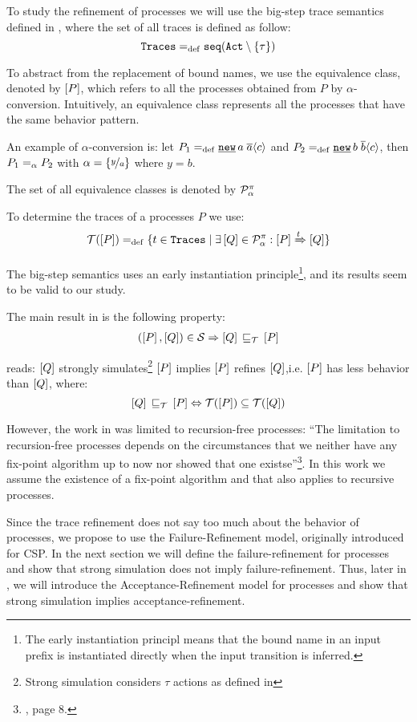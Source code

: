 To study the refinement of \picalc{} processes we will use the big-step trace semantics defined in \cite{gieseking}, where the set of all traces is defined as follow:
\[\tr \define \seqset{\actions\setminus\set{\tau}}\]

To abstract from the replacement of bound names, we use the equivalence class, denoted by $\left[P\right]$, which refers to all the processes obtained from $P$ by $\alpha$-conversion. Intuitively, an equivalence class represents all the processes that have the same behavior pattern.

An example of $\alpha$-conversion is: let $P_1\define\procres{a}{\out{a}{c}}$ and $P_2\define\procres{b}{\out{b}{c}}$, then $P_1 =_\alpha{} P_2$ with $\alpha = \left\{\nicefrac{y}{a}\right\}$ where $y = b$.

The set of all equivalence classes is denoted by $\mathcal P^{\pi}_\alpha$ 

To determine the traces of a processes $P$ we use:
\begin{align}
    \traces[P] \define \{t\in \tr \mid \exists \ec{Q}\in\procsApha: \ec{P} \bigstep{t} \ec{Q}\}
\label{determine_trace}
\end{align}

The big-step semantics uses an early instantiation principle\footnote{The early instantiation principl means that the bound name in an input prefix is instantiated directly when the input transition is inferred.}, and its results seem to be valid to our study.

The main result in \cite{gieseking} is the following property:
\begin{align}
    (\ec{P},\ec{Q})\in{}\simu \Rightarrow \ec{Q} \refi \ec{P} \label{property1}
\end{align}

 reads: $\left[Q\right]$ strongly simulates\footnote{Strong simulation considers $\tau$ actions as defined in } $\left[P\right]$ implies $\left[P\right]$ refines $\left[Q\right]$,i.e. $\left[P\right]$ has less behavior than $\left[Q\right]$, where:
\[\ec{Q}\refi \ec{P} \Leftrightarrow \traces[P]\subseteq\traces[Q]\]

However, the work in \cite{gieseking} was limited to recursion-free processes: ``The limitation to recursion-free processes depends on the circumstances that we neither have any fix-point algorithm up to now nor showed that one existse''\footnote{\cite{gieseking}, page $8$.}. In this work we assume the existence of a fix-point algorithm and that  also applies to recursive processes.

Since the trace refinement does not say too much about the behavior of processes, we propose to use the Failure-Refinement model, originally introduced for CSP. In the next section we will define the failure-refinement for \picalc{} processes and show that strong simulation does not imply failure-refinement. Thus, later in , we will introduce the Acceptance-Refinement model for \picalc{} processes and show that strong simulation implies acceptance-refinement.